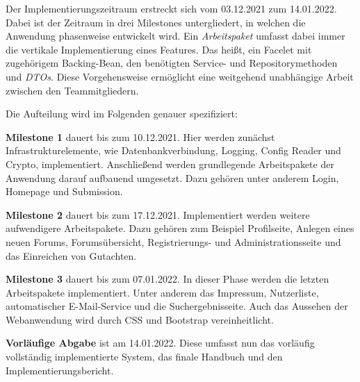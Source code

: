 
Der Implementierungszeitraum erstreckt sich vom 03.12.2021 zum 14.01.2022.
Dabei ist der Zeitraum in drei Milestones untergliedert, in welchen die Anwendung phasenweise entwickelt wird. Ein \emph{Arbeitspaket} umfasst dabei immer die vertikale Implementierung eines Features. Das heißt, ein Facelet mit zugehörigem Backing-Bean, den benötigten Service- und Repositorymethoden und \emph{DTOs}. Diese Vorgehensweise ermöglicht eine weitgehend unabhängige Arbeit zwischen den Teammitgliedern.

Die Aufteilung wird im Folgenden genauer spezifiziert:

\begin{description}
	\item \textbf{Milestone 1} dauert bis zum 10.12.2021. Hier werden zunächst Infrastrukturelemente, wie Datenbankverbindung, Logging, Config Reader und Crypto, implementiert. Anschließend werden grundlegende Arbeitspakete der Anwendung darauf aufbauend umgesetzt. Dazu gehören unter anderem Login, Homepage und Submission.

	\item \textbf{Milestone 2} dauert bis zum 17.12.2021. Implementiert werden weitere aufwendigere Arbeitspakete. Dazu gehören zum Beispiel Profilseite, Anlegen eines neuen Forums, Forumsübersicht, Registrierungs- und Administrationsseite und das Einreichen von Gutachten.

	\item \textbf{Milestone 3} dauert bis zum 07.01.2022. In dieser Phase werden die letzten Arbeitspakete implementiert. Unter anderem das Impressum, Nutzerliste, automatischer E-Mail-Service und die Suchergebnisseite. Auch das Aussehen der Webanwendung wird durch CSS und Bootstrap vereinheitlicht.

	\item \textbf{Vorläufige Abgabe} ist am 14.01.2022. Diese umfasst nun das vorläufig vollständig implementierte System, das finale Handbuch und den Implementierungsbericht.
\end{description}
